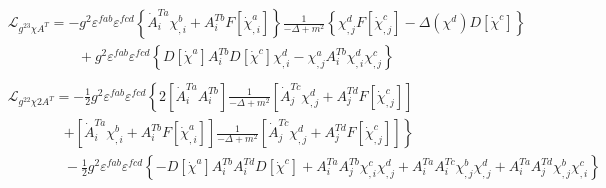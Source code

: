 \documentclass{article}
\begin{document}
\begin{equation*}
\begin{split}
        &\mathcal{L}_{g^23\chi A^T}=-g^2\varepsilon^{fab}\varepsilon^{fcd}\left\{\dot{A}_i^{Ta}\chi^b_{,i}+A_i^{Tb}F[\dot{\chi}_{,i}^a]\right\}\frac{1}{-\Delta+m^2}\left\{\chi_{,j}^dF[\dot{\chi}_{,j}^c]-\Delta(\chi^d)D[\dot{\chi}^c]\right\}\\
        &\quad\quad\quad\quad\quad+g^2\varepsilon^{fab}\varepsilon^{fcd}\left\{D[\dot{\chi}^a]A_i^{Tb}D[\dot{\chi}^c]\chi_{,i}^d-\chi_{,j}^aA_i^{Tb}\chi_{,i}^d\chi_{,j}^c\right\}\\\\
        &\mathcal{L}_{g^22\chi2A^T}=-\frac{1}{2}g^2\varepsilon^{fab}\varepsilon^{fcd}\left\{2\left[\dot{A}_i^{Ta}A_i^{Tb}\right]\frac{1}{-\Delta+m^2}\left[\dot{A}_j^{Tc}\chi_{,j}^d+A_j^{Td}F[\dot{\chi}^c_{,j}]\right]\right.\\
        &\quad\quad\quad\quad\left.+\left[\dot{A}_i^{Ta}\chi_{,i}^b+A_i^{Tb}F[\dot{\chi}^a_{,i}]\right]\frac{1}{-\Delta+m^2}\left[\dot{A}_j^{Tc}\chi_{,j}^d+A_j^{Td}F[\dot{\chi}^c_{,j}]\right]\right\}\\
        &\quad\quad\quad\quad-\frac{1}{2}g^2\varepsilon^{fab}\varepsilon^{fcd}\left\{-D[\dot{\chi}^a]A_i^{Tb}A_i^{Td}D[\dot{\chi}^c]+A_i^{Ta}A_j^{Tb}\chi^c_{,i}\chi^d_{,j}+A_i^{Ta}A_i^{Tc}\chi^b_{,j}\chi^d_{,j}+A_i^{Ta}A_j^{Td}\chi^b_{,j}\chi^c_{,i}\right\}
    \end{split}
\end{equation*}
\end{document}
